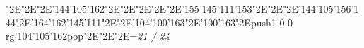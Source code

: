 \null\vfill\enskip\enskip\enskip\ipa\char"2E\enskip\enskip\enskip\ipa\char"2E\enskip\ipa\char"2E\enskip\enskip\enskip\bigskip\ipa\char'144\ipa\char'105\ipa\char'162\ipa\char"2E\enskip\enskip\enskip\ipa\char"2E\enskip\enskip\enskip\enskip\enskip\enskip\bigskip\enskip\enskip\ipa\char"2E\enskip\enskip\enskip\enskip\ipa\char"2E\enskip\ipa\char"2E\ipa\char'155\ipa\char'145\ipa\char'111\ipa\char'153\ipa\char"2E\enskip\enskip\enskip\ipa\char"2E\enskip\enskip\enskip\ipa\char"2E\ipa\char'144\ipa\char'105\ipa\char'156\ipa\char'144\bigskip\enskip\ipa\char"2E\ipa\char'164\ipa\char'162\ipa\char'145\ipa\char'111\ipa\char"2E\enskip\enskip\ipa\char"2E\ipa\char'104\ipa\char'100\ipa\char'163\ipa\char"2E\ipa\char'100\ipa\char'163\ipa\char"2E\enskip\enskip\enskip\enskip\enskip\enskip\bigskip\pdfcolorstack\match push{1 0 0 rg}\ipa\char'104\ipa\char'105\ipa\char'162\pdfcolorstack\match pop{}\ipa\char"2E\enskip\enskip\ipa\char"2E\enskip\enskip\enskip\ipa\char"2E\enskip\enskip\enskip\bigskip\vfill\footline={\hfill\tenrm\it 21 / 24}\eject\bye
